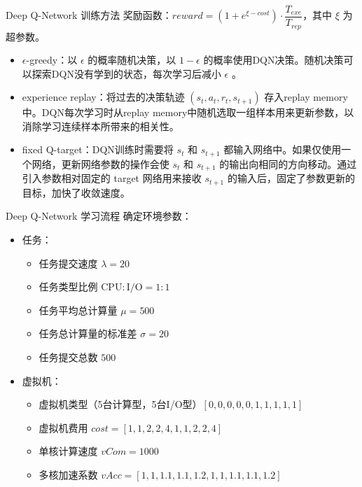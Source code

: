 \begin{frame}{Deep Q-Network 训练方法}
    奖励函数：$reward = (1 + e^{\xi - cost}) \cdot \dfrac{T_{exe}}{T_{rep}}$，其中 $\xi$ 为超参数。

    \begin{itemize}
        \item<2-> $\epsilon$-greedy：以 $\epsilon$ 的概率随机决策，以 $1-\epsilon$ 的概率使用DQN决策。随机决策可以探索DQN没有学到的状态，每次学习后减小 $\epsilon$ 。
        \item<3-> experience replay：将过去的决策轨迹 $(s_t, a_t, r_t, s_{t+1})$ 存入replay memory中。DQN每次学习时从replay memory中随机选取一组样本用来更新参数，以消除学习连续样本所带来的相关性。
        \item<4-> fixed Q-target：DQN训练时需要将 $s_t$ 和 $s_{t+1}$ 都输入网络中。如果仅使用一个网络，更新网络参数的操作会使 $s_t$ 和 $s_{t+1}$ 的输出向相同的方向移动。通过引入参数相对固定的 target 网络用来接收 $s_{t+1}$ 的输入后，固定了参数更新的目标，加快了收敛速度。
    \end{itemize}

\end{frame}

\begin{frame}{Deep Q-Network 学习流程}
    确定环境参数：

    \begin{itemize}
        \item 任务：
              \begin{itemize}
                  \item 任务提交速度 $\lambda = 20$
                  \item 任务类型比例 $\text{CPU} : \text{I/O} = 1 : 1$
                  \item 任务平均总计算量 $\mu = 500$
                  \item 任务总计算量的标准差 $\sigma = 20$
                  \item 任务提交总数 $500$
              \end{itemize}
        \item 虚拟机：
              \begin{itemize}
                  \item 虚拟机类型（5台计算型，5台I/O型）$[0, 0, 0, 0, 0, 1, 1, 1, 1, 1]$
                  \item 虚拟机费用 $cost = [1, 1, 2, 2, 4, 1, 1, 2, 2, 4]$
                  \item 单核计算速度 $vCom = 1000$
                  \item 多核加速系数 $vAcc = [1, 1, 1.1, 1.1, 1.2, 1, 1, 1.1, 1.1, 1.2]$
              \end{itemize}
    \end{itemize}
\end{frame}

